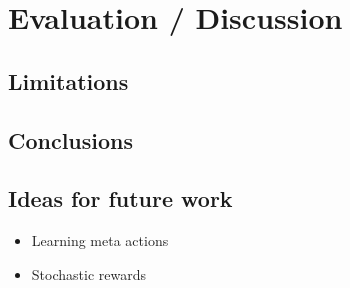 \chapter{Evaluation / Discussion}
\label{chapter6}
\section{Limitations}
\section{Conclusions}

\section{Ideas for future work}
\begin{itemize}
    \item Learning meta actions
    \item Stochastic rewards
\end{itemize}
